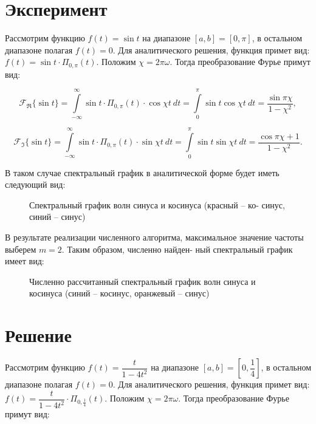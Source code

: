 \documentclass[14pt, titlepage,fleqn]{extarticle}
\newcommand{\Image}[2]{
	\begin{figure}[H]
		\center{\texttt{[image: \#1]}}
		\caption{#2}
	\end{figure}
}
\begin{document}
\section*{Эксперимент}
Рассмотрим функцию $f(t) = \sin t$ на диапазоне $[a, b] = [0, \pi]$, в остальном диапазоне полагая $f(t) = 0$. Для аналитического решения, функция примет вид: $f(t) = \sin t \cdot \Pi_{0,\pi}(t)$. Положим $\chi = 2\pi\omega$. Тогда преобразование Фурье примут вид:

\[\mathscr{F}_\Re\{\sin{t}\} = \int\limits_{-\infty}^{\infty} \sin{t} \cdot \Pi_{0,\pi}(t) \cdot \cos{\chi t}~dt = \int\limits_{0}^{\pi} \sin{t} \cos{\chi t} ~dt = \dfrac{\sin{\pi \chi}}{1 - \chi^2},\]

\[\mathscr{F}_\Im\{\sin{t}\} = \int\limits_{-\infty}^{\infty} \sin{t} \cdot \Pi_{0,\pi}(t) \cdot \sin{\chi t}~dt = \int\limits_{0}^{\pi} \sin{t} \sin{\chi t}  ~dt = \dfrac{\cos{\pi \chi + 1}}{1 - \chi^2}.\]  

В таком случае спектральный график в аналитической форме
будет иметь следующий вид:
\Image{graf.pdf}{Спектральный график волн синуса и косинуса (красный – ко-
синус, синий – синус)}
В результате реализации численного алгоритма, максимальное
значение частоты выберем $ m = 2$. Таким образом, численно найден-
ный спектральный график имеет вид:

\begin{figure}[H]
	\caption{Численно рассчитанный спектральный график волн синуса и
	косинуса (синий – косинус, оранжевый – синус)}
\end{figure}
\newpage










\section*{Решение}
Рассмотрим функцию $f(t) = \dfrac{t}{1 - 4t^2}$ на диапазоне $[a, b] = \left[0, \dfrac{1}{4}\right]$, в остальном диапазоне полагая $f(t) = 0$. Для аналитического решения, функция примет вид: $f(t) = \dfrac{t}{1 - 4t^2} \cdot \Pi_{0,\frac{1}{4}}(t)$. Положим $\chi = 2\pi\omega$. Тогда преобразование Фурье примут вид:
\end{document}

